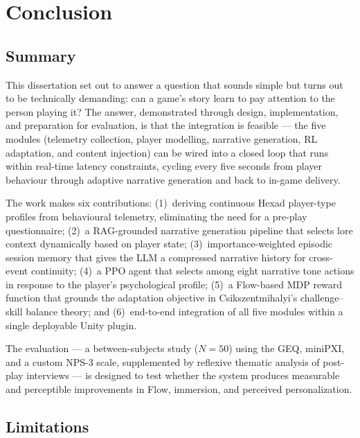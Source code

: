 \chapter{Conclusion}

\section{Summary}

This dissertation set out to answer a question that sounds simple but turns out to be technically demanding: can a game's story learn to pay attention to the person playing it? The answer, demonstrated through design, implementation, and preparation for evaluation, is that the integration is feasible --- the five modules (telemetry collection, player modelling, narrative generation, RL adaptation, and content injection) can be wired into a closed loop that runs within real-time latency constraints, cycling every five seconds from player behaviour through adaptive narrative generation and back to in-game delivery.

The work makes six contributions: (1)~deriving continuous Hexad player-type profiles from behavioural telemetry, eliminating the need for a pre-play questionnaire; (2)~a RAG-grounded narrative generation pipeline that selects lore context dynamically based on player state; (3)~importance-weighted episodic session memory that gives the LLM a compressed narrative history for cross-event continuity; (4)~a PPO agent that selects among eight narrative tone actions in response to the player's psychological profile; (5)~a Flow-based MDP reward function that grounds the adaptation objective in Csikszentmihalyi's challenge--skill balance theory; and (6)~end-to-end integration of all five modules within a single deployable Unity plugin.

The evaluation --- a between-subjects study ($N = 50$) using the GEQ, miniPXI, and a custom NPS-3 scale, supplemented by reflexive thematic analysis of post-play interviews --- is designed to test whether the system produces measurable and perceptible improvements in Flow, immersion, and perceived personalization.

\section{Limitations}

